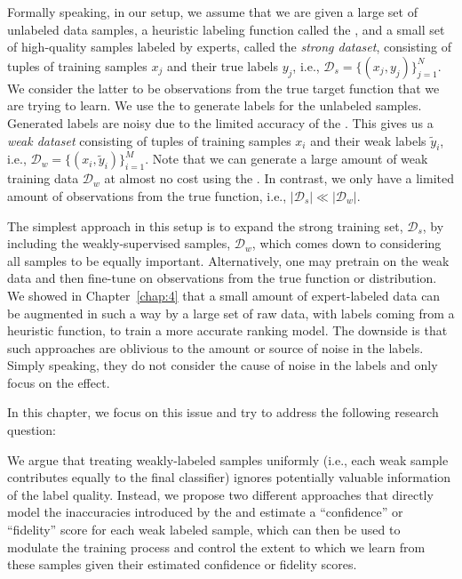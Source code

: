 Formally speaking, in our setup, we assume that we are given a large set of unlabeled data samples, a heuristic labeling function called the \emph{\wa}, and a small set of high-quality samples labeled by experts, called the \emph{strong dataset}, consisting of tuples of training samples $x_j$ and their true labels $y_j$, i.e., $\mathcal{D}_s=\{(x_j,y_j)\}_{j=1}^{N}$. We consider the latter to be observations from the true target function that we are trying to learn. 
We use the \wa to generate labels for the unlabeled samples. Generated labels are noisy due to the limited accuracy of the \wa. This gives us a \emph{weak dataset} consisting of tuples of training samples $x_i$ and their weak labels $\tilde{y}_i$, i.e., $\mathcal{D}_w=\{(x_i, \tilde{y}_i)\}_{i=1}^{M}$.  Note that we can generate a large amount of weak training data $\mathcal{D}_w$ at almost no cost using the \wa. In contrast, we only have a limited amount of observations from the true function, i.e., $|\mathcal{D}_s| \ll |\mathcal{D}_w|$. 

The simplest approach in this setup is to expand the strong training set, $\mathcal{D}_s$, by including the weakly-supervised samples, $\mathcal{D}_w$, which comes down to considering all samples to be equally important. Alternatively, one may pretrain on the weak data and then fine-tune on observations from the true function or distribution. We showed in Chapter~\ref{chap:4} that a small amount of expert-labeled data can be augmented in such a way by a large set of raw data, with labels coming from a heuristic function, to train a more accurate ranking model.
The downside is that such approaches are oblivious to the amount or source of noise in the labels. Simply speaking, they do not consider the cause of noise in the labels and only focus on the effect. 

In this chapter, we focus on this issue and try to address the following research question:

We argue that treating weakly-labeled samples uniformly (i.e., each weak sample contributes equally to the final classifier) ignores potentially valuable information of the label quality. 
Instead, we propose two different approaches that directly model the inaccuracies introduced by the \wa and estimate a ``confidence'' or ``fidelity'' score for each weak labeled sample, which can then be used to modulate the training process and control the extent to which we learn from these samples given their estimated confidence or fidelity scores.



